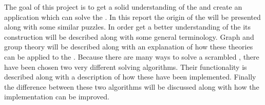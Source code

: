 The goal of this project is to get a solid understanding of the \rubik{} and create an application which can solve the \rubik{}.
In this report the origin of the \rubik{} will be presented along with some similar puzzles. 
In order get a better understanding of the \rubik{} its construction will be described along with some general terminology. 
Graph and group theory will be described along with an explanation of how these theories can be applied to the \rubik{}.
Because there are many ways to solve a scrambled \rubik{}, there have been chosen two very different solving algorithms.
Their functionality is described along with a description of how these have been implemented.
Finally the difference between these two algorithms will be discussed along with how the implementation can be improved.